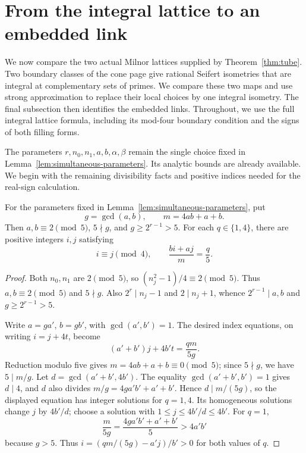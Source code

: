 \section{From the integral lattice to an embedded link}\label{sec:fourfold-arithmetic}

We now compare the two actual Milnor lattices supplied by
Theorem~\ref{thm:tube}. Two boundary classes of the cone page give
rational Seifert isometries that are integral at complementary sets
of primes. We compare these two maps and use strong approximation to
replace their local choices by one integral isometry. The final
subsection then identifies the embedded links. Throughout, we use the
full integral lattice formula, including its mod-four boundary
condition and the signs of both filling forms.

The parameters \(r,n_0,n_1,a,b,\alpha,\beta\) remain the single
choice fixed in Lemma~\ref{lem:simultaneous-parameters}. Its analytic
bounds are already available. We begin with the remaining
divisibility facts and positive indices needed for the real-sign
calculation.

\begin{lemma}\label{lem:parameter-indices}
For the parameters fixed in Lemma~\ref{lem:simultaneous-parameters}, put
\[
 g=\gcd(a,b),\qquad m=4ab+a+b.
\]
Then \(a,b\equiv2\pmod5\), \(5\nmid g\), and
\(g\ge 2^{r-1}>5\). For each \(q\in\{1,4\}\), there are positive
integers \(i,j\) satisfying
\[
 i\equiv j\pmod4,\qquad \frac{bi+aj}{m}=\frac q5 .
\]
\end{lemma}

\begin{proof}
Both \(n_0,n_1\) are \(2\pmod5\), so
\((n_j^2-1)/4\equiv2\pmod5\). Thus \(a,b\equiv2\pmod5\)
and \(5\nmid g\). Also \(2^r\mid n_j-1\) and \(2\mid n_j+1\),
whence \(2^{r-1}\mid a,b\) and \(g\ge2^{r-1}>5\).

Write \(a=ga'\), \(b=gb'\), with \(\gcd(a',b')=1\).
The desired index equations, on writing \(i=j+4t\), become
\[
 (a'+b')j+4b't=\frac{qm}{5g}.
\]
Reduction modulo five gives \(m=4ab+a+b\equiv0\pmod5\);
since \(5\nmid g\), we have \(5\mid m/g\). Let
\(d=\gcd(a'+b',4b')\). The equality \(\gcd(a'+b',b')=1\)
gives \(d\mid4\), and \(d\) also divides
\(m/g=4ga'b'+a'+b'\). Hence \(d\mid m/(5g)\), so the
displayed equation has integer solutions for \(q=1,4\).
Its homogeneous solutions change \(j\) by \(4b'/d\); choose a
solution with \(1\le j\le4b'/d\le4b'\). For \(q=1\),
\[
 \frac{m}{5g}
   =\frac{4ga'b'+a'+b'}5
   >4a'b'
\]
because \(g>5\). Thus
\(i=(qm/(5g)-a'j)/b'>0\) for both values of \(q\).
\end{proof}

